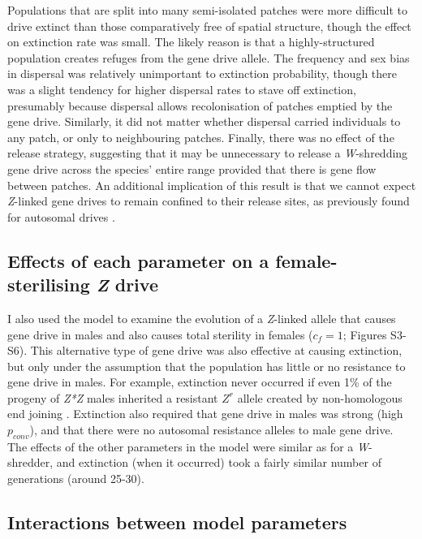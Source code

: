\documentclass[]{rsos}%
\begin{document}
Populations that are split into many semi-isolated patches were more
difficult to drive extinct than those comparatively free of spatial
structure, though the effect on extinction rate was small. The likely
reason is that a highly-structured population creates refuges from the
gene drive allele. The frequency and sex bias in dispersal was
relatively unimportant to extinction probability, though there was a
slight tendency for higher dispersal rates to stave off extinction,
presumably because dispersal allows recolonisation of patches emptied by
the gene drive. Similarly, it did not matter whether dispersal carried
individuals to any patch, or only to neighbouring patches. Finally,
there was no effect of the release strategy, suggesting that it may be
unnecessary to release a \emph{W}-shredding gene drive across the
species' entire range provided that there is gene flow between patches.
An additional implication of this result is that we cannot expect
\emph{Z}-linked gene drives to remain confined to their release sites,
as previously found for autosomal drives \citep{noble2018cu}.

\hypertarget{effects-of-each-parameter-on-a-female-sterilising-z-drive}{%
\subsection{\texorpdfstring{Effects of each parameter on a
female-sterilising \emph{Z}
drive}{Effects of each parameter on a female-sterilising Z drive}}\label{effects-of-each-parameter-on-a-female-sterilising-z-drive}}

I also used the model to examine the evolution of a \emph{Z}-linked
allele that causes gene drive in males and also causes total sterility
in females (\(c_f = 1\); Figures S3-S6). This alternative type of gene
drive was also effective at causing extinction, but only under the
assumption that the population has little or no resistance to gene drive
in males. For example, extinction never occurred if even 1\% of the
progeny of \emph{Z*Z} males inherited a resistant \(Z^r\) allele created
by non-homologous end joining \citep[c.f.][]{unckless2017ev}. Extinction
also required that gene drive in males was strong (high \(p_{conv}\)),
and that there were no autosomal resistance alleles to male gene drive.
The effects of the other parameters in the model were similar as for a
\emph{W}-shredder, and extinction (when it occurred) took a fairly
similar number of generations (around 25-30).

\hypertarget{interactions-between-model-parameters}{%
\subsection{Interactions between model
parameters}\label{interactions-between-model-parameters}}
\end{document}
